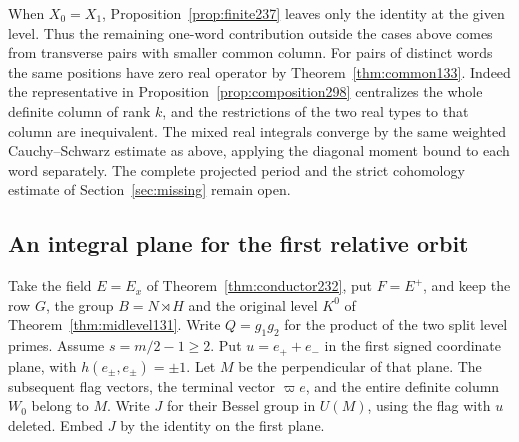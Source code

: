 \documentclass[a4paper,11pt]{article}
\theoremstyle{definition}
\theoremstyle{remark}
\numberwithin{equation}{section}
\begin{document}
When \(X_0=X_1\), Proposition~\ref{prop:finite237} leaves
only the identity at the given level. Thus the remaining
one-word contribution outside the cases above comes from
transverse pairs with smaller common column. For pairs of
distinct words the same positions have zero real operator
by Theorem~\ref{thm:common133}. Indeed the representative
in Proposition~\ref{prop:composition298} centralizes the
whole definite column of rank \(k\), and the restrictions
of the two real types to that column are inequivalent.
The mixed real integrals converge by the same weighted
Cauchy--Schwarz estimate as above, applying the diagonal
moment bound to each word separately.
The complete
projected period and the strict cohomology estimate of
Section~\ref{sec:missing} remain open.

\subsection{An integral plane for the first relative orbit}\label{nav:V-45}
Take the field \(E=E_x\) of Theorem~\ref{thm:conductor232},
put \(F=E^+\), and keep the row \(G\), the group \(B=N\rtimes H\)
and the original level \(K^0\) of Theorem~\ref{thm:midlevel131}.
Write \(Q=g_1g_2\) for the product of the two split level primes.
Assume \(s=m/2-1\ge2\). Put \(u=e_++e_-\) in the first signed
coordinate plane, with \(h(e_\pm,e_\pm)=\pm1\).
Let \(M\) be the perpendicular of that plane. The subsequent
flag vectors, the terminal vector \(\varpi e\), and the entire
definite column \(W_0\) belong to \(M\). Write \(J\) for their
Bessel group in \(U(M)\), using the flag with \(u\) deleted.
Embed \(J\) by the identity on the first plane.
\end{document}
